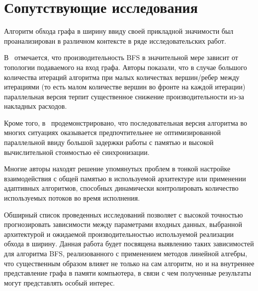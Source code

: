 
\section{Сопутствующие исследования}
\label{sec:relatedworks}
Алгоритм обхода графа в ширину ввиду своей прикладной значимости был проанализирован в различном контексте в ряде исследовательских работ.

В~\cite{adaptiveBFS} отмечается, что производительность BFS в значительной мере зависит от топологии подаваемого на вход графа. Авторы показали, что в случае большого количества итераций алгоритма при малых количествах вершин/ребер между итерациями (то есть малом количестве вершин во фронте на каждой итерации) параллельная версия терпит существенное снижение производительности из-за накладных расходов.

Кроме того, в~\cite{scalableBFS} продемонстрировано, что последовательная версия алгоритма во многих ситуациях оказывается предпочтительнее не оптимизированной параллельной ввиду большой задержки работы с памятью и высокой вычислительной стоимостью её синхронизации. 

Многие авторы находят решение упомянутых проблем в тонкой настройке взаимодействия с общей памятью в используемой архитектуре или применении адаптивных алгоритмов, способных динамически контролировать количество используемых потоков во время исполнения.

Обширный список проведенных исследований позволяет с высокой точностью прогнозировать зависимости между параметрами входных данных, выбранной архитектурой и ожидаемой производительностью используемой реализации обхода в ширину. Данная работа будет посвящена выявлению таких зависимостей для алгоритма BFS, реализованного с применением методов линейной алгебры, что существенным образом влияет не только на сам алгоритм, но и на внутреннее представление графа в памяти компьютера, в связи с чем полученные результаты могут представлять особый интерес.

